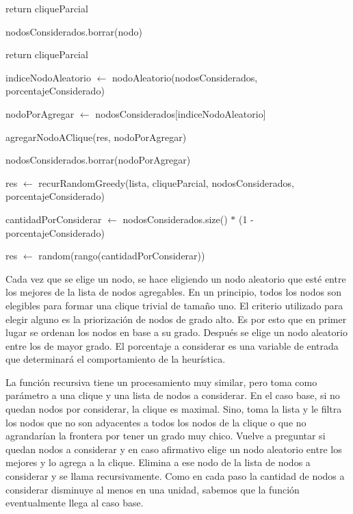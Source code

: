 \begin{algorithm}[H]
	\NoCaptionOfAlgo
	\caption{}
	
	{
		return cliqueParcial
	}
	
	{
		{
			nodosConsiderados.borrar(nodo)
		}
	}

	{
		return cliqueParcial
	}
	
	indiceNodoAleatorio $\leftarrow$ nodoAleatorio(nodosConsiderados, porcentajeConsiderado)
	
	nodoPorAgregar $\leftarrow$ nodosConsiderados[indiceNodoAleatorio]
	
	agregarNodoAClique(res, nodoPorAgregar)

	nodosConsiderados.borrar(nodoPorAgregar)
	
	res $\leftarrow$ recurRandomGreedy(lista, cliqueParcial, nodosConsiderados, porcentajeConsiderado)

\end{algorithm}

\begin{algorithm}[H]
	\NoCaptionOfAlgo
	\caption{}
	
		cantidadPorConsiderar $\leftarrow$ nodosConsiderados.size() $*$ (1 - porcentajeConsiderado)
		
		res $\leftarrow$ random(rango(cantidadPorConsiderar))

\end{algorithm}

Cada vez que se elige un nodo, se hace eligiendo un nodo aleatorio que esté entre los mejores de la lista de nodos agregables. En un principio, todos los nodos son elegibles para formar una clique trivial de tamaño uno. El criterio utilizado para elegir alguno es la priorización de nodos de grado alto. Es por esto que en primer lugar se ordenan los nodos en base a su grado. Después se elige un nodo aleatorio entre los de mayor grado. El porcentaje a considerar es una variable de entrada que determinará el comportamiento de la heurística.

La función recursiva tiene un procesamiento muy similar, pero toma como parámetro a una clique y una lista de nodos a considerar. En el caso base, si no quedan nodos por considerar, la clique es maximal. Sino, toma la lista y le filtra los nodos que no son adyacentes a todos los nodos de la clique o que no agrandarían la frontera por tener un grado muy chico. Vuelve a preguntar si quedan nodos a considerar y en caso afirmativo elige un nodo aleatorio entre los mejores y lo agrega a la clique. Elimina a ese nodo de la lista de nodos a considerar y se llama recursivamente. Como en cada paso la cantidad de nodos a considerar disminuye al menos en una unidad, sabemos que la función eventualmente llega al caso base.

